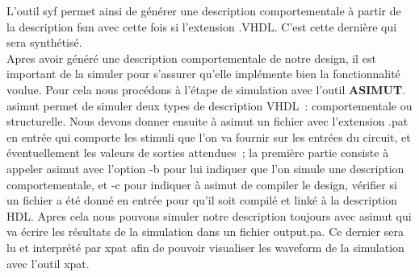 \documentclass[12pt]{article}
\begin{document}
 L’outil syf permet ainsi de générer une description comportementale à partir de la description fsm avec cette fois si l'extension .VHDL. C'est cette dernière qui sera synthétisé.\\

Apres avoir généré une description comportementale de notre design, il est important de la simuler pour s'assurer qu'elle implémente bien la fonctionnalité voulue. Pour cela nous procédons à l'étape de simulation avec l'outil \textbf{ASIMUT}. asimut permet de simuler deux types de description VHDL : comportementale ou structurelle. Nous devons donner ensuite à asimut un fichier avec l'extension .pat en entrée qui comporte les stimuli que l'on va fournir sur les entrées du circuit, et éventuellement les valeurs de sorties attendues ; la première partie consiste à appeler asimut avec l'option -b pour lui indiquer que l'on simule une description comportementale, et -c pour indiquer à asimut de compiler le design, vérifier si un fichier a été donné en entrée pour qu'il soit compilé et linké à la description HDL. Apres cela nous pouvons simuler notre description toujours avec asimut qui va  écrire les résultats de la simulation dans un fichier output.pa. Ce dernier sera lu et interprété par xpat afin de pouvoir visualiser les waveform de la simulation avec l'outil xpat.\\
\end{document}
